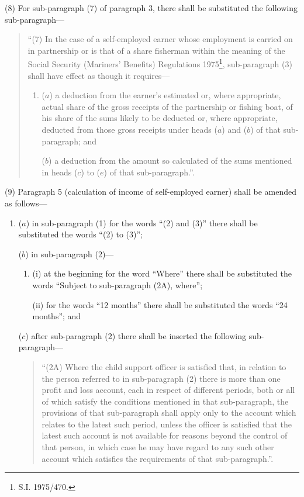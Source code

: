 \documentclass[a4paper]{article}
\begin{document}
(8) For sub-paragraph (7) of paragraph 3, there shall be substituted the following sub-paragraph—
\begin{quotation}
“(7) In the case of a self-employed earner whose employment is carried on in partnership or is that of a share fisherman within the meaning of the Social Security (Mariners' Benefits) Regulations 1975\footnote{\frenchspacing S.I. 1975/470.}, sub-paragraph (3) shall have effect as though it requires—
\begin{enumerate}\item[]
($a$) a deduction from the earner’s estimated or, where appropriate, actual share of the gross receipts of the partnership or fishing boat, of his share of the sums likely to be deducted or, where appropriate, deducted from those gross receipts under heads ($a$) and ($b$) of that sub-paragraph; and

($b$) a deduction from the amount so calculated of the sums mentioned in heads ($c$) to ($e$) of that sub-paragraph.”.
\end{enumerate}
\end{quotation}

(9) Paragraph 5 (calculation of income of self-employed earner) shall be amended as follows—
\begin{enumerate}\item[]
($a$) in sub-paragraph (1) for the words “(2) and (3)” there shall be substituted the words “(2) to (3)”;

($b$) in sub-paragraph (2)—
\begin{enumerate}\item[]
(i) at the beginning for the word “Where” there shall be substituted the words “Subject to sub-paragraph (2A), where”;

(ii) for the words “12 months” there shall be substituted the words “24 months”; and
\end{enumerate}

($c$) after sub-paragraph (2) there shall be inserted the following sub-paragraph—
\begin{quotation}
“(2A) Where the child support officer is satisfied that, in relation to the person referred to in sub-paragraph (2) there is more than one profit and loss account, each in respect of different periods, both or all of which satisfy the conditions mentioned in that sub-paragraph, the provisions of that sub-paragraph shall apply only to the account which relates to the latest such period, unless the officer is satisfied that the latest such account is not available for reasons beyond the control of that person, in which case he may have regard to any such other account which satisfies the requirements of that sub-paragraph.”.
\end{quotation}
\end{enumerate}
\end{document}
